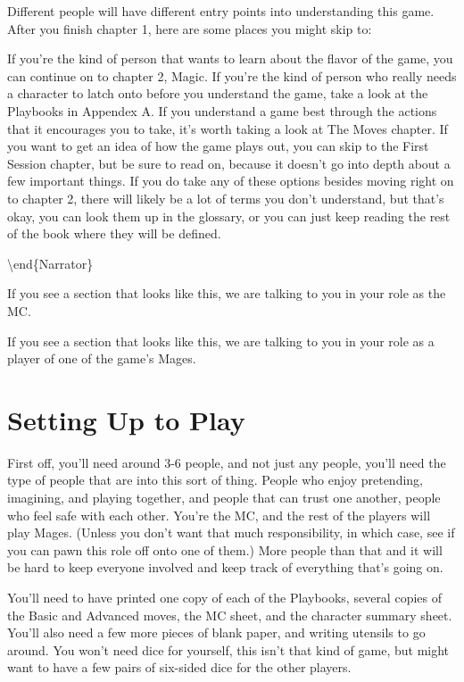 \documentclass[
  oneside,
  statementpaper,
  9pt]{memoir}
\begin{document}
Different people will have different entry points into understanding
this game. After you finish chapter 1, here are some places you might
skip to:

If you're the kind of person that wants to learn about the flavor of the
game, you can continue on to chapter 2, Magic. If you're the kind of
person who really needs a character to latch onto before you understand
the game, take a look at the Playbooks in Appendex A. If you understand
a game best through the actions that it encourages you to take, it's
worth taking a look at The Moves chapter. If you want to get an idea of
how the game plays out, you can skip to the First Session chapter, but
be sure to read on, because it doesn't go into depth about a few
important things. If you do take any of these options besides moving
right on to chapter 2, there will likely be a lot of terms you don't
understand, but that's okay, you can look them up in the glossary, or
you can just keep reading the rest of the book where they will be
defined.

\textbackslash end\{Narrator\}

\begin{MC}

If you see a section that looks like this, we are talking to you in your role as the MC.

\end{MC}

\begin{Player}

If you see a section that looks like this, we are talking to you in your role as a player of one of the game's Mages.

\end{Player}

\hypertarget{setting-up-to-play}{%
\section{Setting Up to Play}\label{setting-up-to-play}}

\begin{MC}

First off, you’ll need around 3-6 people, and not just any people, you’ll need the type of people that are into this sort of thing. People who enjoy pretending, imagining, and playing together, and people that can trust one another, people who feel safe with each other. You're the MC, and the rest of the players will play Mages. (Unless you don't want that much responsibility, in which case, see if you can pawn this role off onto one of them.) More people than that and it will be hard to keep everyone involved and keep track of everything that’s going on.

You’ll need to have printed one copy of each of the Playbooks, several copies of the Basic and Advanced moves, the MC sheet, and the character summary sheet. You’ll also need a few more pieces of blank paper, and writing utensils to go around. You won't need dice for yourself, this isn't that kind of game, but might want to have a few pairs of six-sided dice for the other players.

\end{MC}
\end{document}
